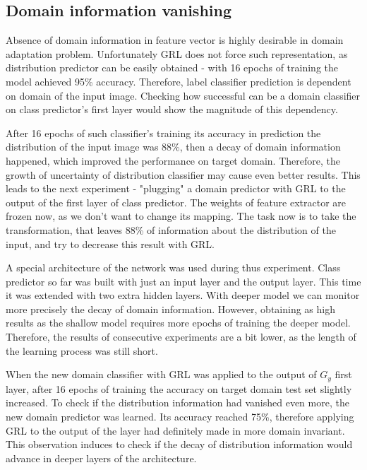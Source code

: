 \documentclass{article}
\begin{document}
\subsection{Domain information vanishing}
Absence of domain information in feature vector is highly desirable in domain adaptation problem. Unfortunately GRL does not force such representation, as distribution predictor can be easily obtained - with 16 epochs of training the model achieved 95\% accuracy. Therefore, label classifier prediction is dependent on domain of the input image. Checking how successful can be a domain classifier on class predictor's first layer would show the magnitude of this dependency. 
\par
After 16 epochs of such classifier's training its accuracy in prediction the distribution of the input image was 88\%, then a decay of domain information happened, which improved the performance on target domain. Therefore, the growth of uncertainty of distribution classifier may cause even better results. This leads to the next experiment - "plugging" a domain predictor with GRL to the output of the first layer of class predictor. The weights of feature extractor are frozen now, as we don't want to change its mapping. The task now is to take the transformation, that leaves 88\% of information about the distribution of the input, and try to decrease this result with GRL.
\par
A special architecture of the network was used during thus experiment. Class predictor so far was built with just an input layer and the output layer. This time it was extended with two extra hidden layers. With deeper model we can monitor more precisely the decay of domain information. However, obtaining as high results as the shallow model requires more epochs of training the deeper model. Therefore, the results of consecutive experiments are a bit lower, as the length of the learning process was still short.
\par
When the new domain classifier with GRL was applied to the output of $G_{y}$ first layer, after 16 epochs of training the accuracy on target domain test set slightly increased. To check if the distribution information had vanished even more, the new domain predictor was learned. Its accuracy reached 75\%, therefore applying GRL to the output of the layer had definitely made in more domain invariant. This observation induces to check if the decay of distribution information would advance in deeper layers of the architecture.
\par
\end{document}
